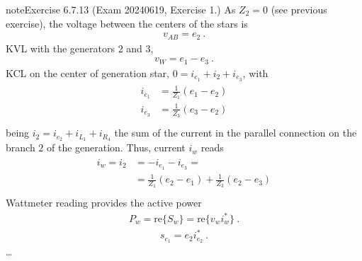 \documentclass[letterpaper,10pt,english]{jupyterBook}
\begin{document}
\begin{sphinxadmonition}{note}{Exercise 6.7.13 (Exam 2024\sphinxhyphen{}06\sphinxhyphen{}19, Exercise 1.)}
\sphinxAtStartPar
{} As \(Z_2 = 0\) (see previous exercise), the voltage between the centers of the stars is
\begin{equation*}
\begin{split}v_{AB} = e_2 \ .\end{split}
\end{equation*}
\sphinxAtStartPar
{} KVL with the generators \(2\) and \(3\),
\begin{equation*}
\begin{split}v_W = e_1 - e_3 \ .\end{split}
\end{equation*}
\sphinxAtStartPar
{} KCL on the center of generation star, \(0 = i_{e_1} + i_{2} + i_{e_3}\), with
\begin{equation*}
\begin{split}\begin{aligned}
  i_{e_1} & =  \frac{1}{Z_1} ( e_1 - e_2 ) \\
  i_{e_3} & =  \frac{1}{Z_3} ( e_3 - e_2 ) \\
\end{aligned}\end{split}
\end{equation*}
\sphinxAtStartPar
being \(i_2 = i_{e_2} + i_{L_1} + i_{R_4}\) the sum of the current in the parallel connection on the branch \(2\) of the generation. Thus, current \(i_{w}\) reads
\begin{equation*}
\begin{split}\begin{aligned}
  i_w = i_{2} 
  & = - i_{e_1} - i_{e_3} = \\
  & = \frac{1}{Z_1} ( e_2 - e_1 ) + \frac{1}{Z_3} ( e_2 - e_3 ) \\
\end{aligned}\end{split}
\end{equation*}
\sphinxAtStartPar
{} Wattmeter reading provides the active power
\begin{equation*}
\begin{split}P_w = \text{re} \{ S_w \} = \text{re} \{ v_w i_w^* \} \ .\end{split}
\end{equation*}
\sphinxAtStartPar
{}
\begin{equation*}
\begin{split}s_{e_1} = e_{2} i_{e_2}^* \ .\end{split}
\end{equation*}
\sphinxAtStartPar
…
\end{sphinxadmonition}
 \label{exercise:exam-24-02-13-exe-02}
\end{document}

